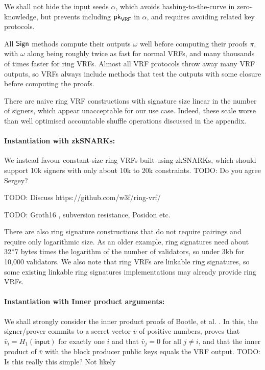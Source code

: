 {We shall not hide the input seeds $\alpha$, which avoids hashing-to-the-curve in zero-knowledge, but prevents including $\mathsf{pk}_{\mathsf{VRF}}$ in $\alpha$, and requires avoiding related key protocols.

All $\mathsf{Sign}$ methods compute their outputs $\omega$ well before computing their proofs $\pi$, with $\omega$ along being roughly twice as fast for normal VRFs, and many thousands of times faster for ring VRFs.  Almost all VRF protocols throw away many VRF outputs, so VRFs always include methods that test the outputs with some closure before computing the proofs.

There are naive ring VRF constructions with signature size linear in the number of signers, which appear unacceptable for our use case.  Indeed, these scale worse than well optimised accountable shuffle operations discussed in the appendix.

\paragraph{Instantiation with zkSNARKs:}

We instead favour constant-size ring VRFs built using zkSNARKs, which should support 10k signers with only about 10k to 20k constraints.  TODO: Do you agree Sergey?

TODO:  Discuss https://github.com/w3f/ring-vrf/

TODO:  Groth16 \cite{Groth16}, subversion resistance, Posidon etc.

There are also ring signature constructions that do not require pairings and require only logarithmic size.  As an older example, ring signatures \cite{GK2015} need about 32*7 bytes times the logarithm of the number of validators, so under 3kb for 10,000 validators.  We also note that ring VRFs are linkable ring signatures, so some existing linkable ring signatures implementations may already provide ring VRFs.

\paragraph{Instantiation with Inner product arguments:}

We shall strongly consider the inner product proofs of Bootle, et al. \cite{bccgp2016}.  In this, the signer/prover commits to a secret vector $\bar{v}$ of positive numbers, proves that $\bar{v}_i = H_1(\mathsf{input})$ for exactly one $i$ and that $\bar{v}_j = 0$ for all $j \ne i$, and that the inner product of $\bar{v}$ with the block producer public keys equals the VRF output.  TODO:  Is this really this simple?  Not likely

}
